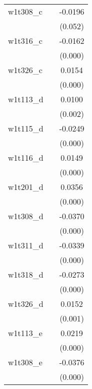 {\begin{tabular}{l*{2}{c}}
w1t308\_c    &                     &     -0.0196         \\
            &                     &     (0.052)         \\
[1em]
w1t316\_c    &                     &     -0.0162\sym{***}\\
            &                     &     (0.000)         \\
[1em]
w1t326\_c    &                     &      0.0154\sym{***}\\
            &                     &     (0.000)         \\
[1em]
w1t113\_d    &                     &      0.0100\sym{**} \\
            &                     &     (0.002)         \\
[1em]
w1t115\_d    &                     &     -0.0249\sym{***}\\
            &                     &     (0.000)         \\
[1em]
w1t116\_d    &                     &      0.0149\sym{***}\\
            &                     &     (0.000)         \\
[1em]
w1t201\_d    &                     &      0.0356\sym{***}\\
            &                     &     (0.000)         \\
[1em]
w1t308\_d    &                     &     -0.0370\sym{***}\\
            &                     &     (0.000)         \\
[1em]
w1t311\_d    &                     &     -0.0339\sym{***}\\
            &                     &     (0.000)         \\
[1em]
w1t318\_d    &                     &     -0.0273\sym{***}\\
            &                     &     (0.000)         \\
[1em]
w1t326\_d    &                     &      0.0152\sym{***}\\
            &                     &     (0.001)         \\
[1em]
w1t113\_e    &                     &      0.0219\sym{***}\\
            &                     &     (0.000)         \\
[1em]
w1t308\_e    &                     &     -0.0376\sym{***}\\
            &                     &     (0.000)         \\

\end{tabular}}
